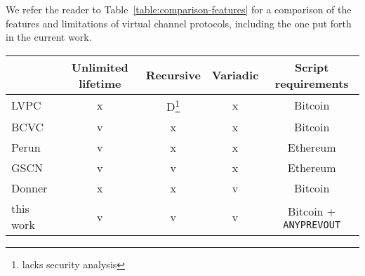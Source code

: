   We refer the reader to Table~\ref{table:comparison-features} for a comparison of the
  features and limitations of virtual channel protocols, including the one put
  forth in the current work.

  \begin{table*}
    \caption{Features \& requirements comparison of virtual channel protocols}
    \label{table:comparison-features}
    \begin{minipage}{\textwidth}
    \begin{center}
    \begin{tabular}{|l|c|c|c|c|}
    \hline
              & Unlimited lifetime & Recursive & Variadic & Script requirements \\
    \hline
    LVPC~\cite{10.1007/978-3-030-65411-5_18}
              & x                  & D\footnote{lacks security analysis}
                                               & x         & Bitcoin \\
    \hline
    BCVC~\cite{cryptoeprint:2020:554}
              & v                  & x         & x         & Bitcoin \\
    \hline
    Perun~\cite{perun}
              & v                  & x         & x         & Ethereum \\
    \hline
    GSCN~\cite{DBLP:conf/ccs/DziembowskiFH18}
              & v                  & v         & x         & Ethereum \\
    \hline
    Donner~\cite{donner}
              & x                  & x         & v         & Bitcoin \\
    \hline
    this work & v                  & v         & v         & Bitcoin + \texttt{ANYPREVOUT} \\
    \hline
    \end{tabular}
    \end{center}
    \end{minipage}
  \end{table*}
